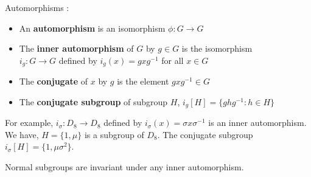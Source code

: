 \begin{definition}Automorphisms : 
	\begin{itemize}
		\item An \textbf{automorphism} is an isomorphism $\phi : G \to G$
		\item The \textbf{inner automorphism} of $G$ by $g \in G$ is the isomorphism\\
			$i_g : G \to G$ defined by $i_g(x) = gxg^{-1}$ for all $x \in G$
		\item The \textbf{conjugate} of $x$ by $g$ is the element $gxg^{-1} \in G$
		\item The \textbf{conjugate subgroup} of subgroup $H$, $i_g[H] = \{ ghg^{-1} : h \in H \}$
	\end{itemize}
\end{definition}

\begin{remark}
	For example, $i_\sigma : D_8 \to D_8$ defined by $i_\sigma(x) = \sigma x \sigma^{-1}$ is an inner automorphism.
	We have, $H = \{ 1,\mu \}$ is a subgroup of $D_8$.
	The conjugate subgroup $i_\sigma[H] = \{ 1,\mu\sigma^2 \}$.
\end{remark}

\begin{remark}
	Normal subgroups are invariant under any inner automorphism.
\end{remark}
